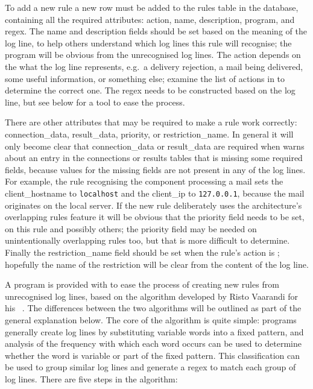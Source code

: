 To add a new rule a new row must be added to the rules table in the
database, containing all the required attributes: action, name,
description, program, and regex.  The name and description fields should be
set based on the meaning of the log line, to help others understand which
log lines this rule will recognise; the program will be obvious from the
unrecognised log lines.  The action depends on the what the log line
represents, e.g.\ a delivery rejection, a mail being delivered, some useful
information, or something else; examine the list of actions in
 to determine the correct
one.  The regex needs to be constructed based on the log line, but see
below for a tool to ease the process.

There are other attributes that may be required to make a rule work
correctly: connection\_data, result\_data, priority, or restriction\_name.
In general it will only become clear that connection\_data or result\_data
are required when \parsername{} warns about an entry in the connections or
results tables that is missing some required fields, because values for the
missing fields are not present in any of the log lines.  For example, the
rule recognising the  component processing a mail sets the
client\_hostname to \texttt{localhost} and the client\_ip to
\texttt{127.0.0.1}, because the mail originates on the local server.  If
the new rule deliberately uses the architecture's overlapping rules feature
it will be obvious that the priority field needs to be set, on this rule
and possibly others; the priority field may be needed on unintentionally
overlapping rules too, but that is more difficult to determine.  Finally
the restriction\_name field should be set when the rule's action is
; hopefully the name of the restriction will be
clear from the content of the log line.

A program is provided with \parsername{} to ease the process of creating
new rules from unrecognised log lines, based on the algorithm developed by
Risto Vaarandi for his ~\cite{slct-paper}.  The differences
between the two algorithms will be outlined as part of the general
explanation below.  The core of the  algorithm is quite
simple: programs generally create log lines by substituting variable words
into a fixed pattern, and analysis of the frequency with which each word
occurs can be used to determine whether the word is variable or part of the
fixed pattern.  This classification can be used to group similar log lines
and generate a regex to match each group of log lines.  There are five steps
in the algorithm:

